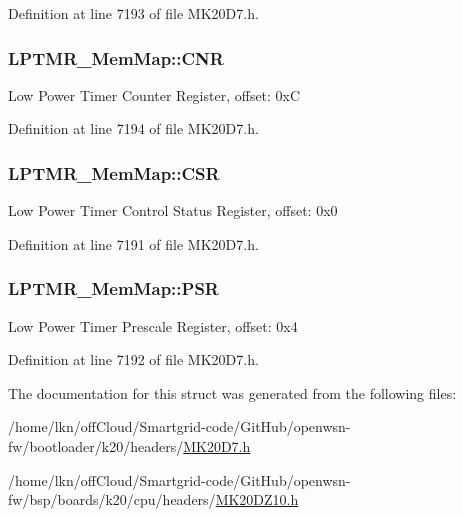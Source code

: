 Definition at line 7193 of file M\+K20\+D7.\+h.

\subsubsection[{\texorpdfstring{C\+NR}{CNR}}]{ L\+P\+T\+M\+R\+\_\+\+Mem\+Map\+::\+C\+NR}\hypertarget{struct_l_p_t_m_r___mem_map_adda036ea26ea5cc89d7957779c5680f0}{}\label{struct_l_p_t_m_r___mem_map_adda036ea26ea5cc89d7957779c5680f0}
Low Power Timer Counter Register, offset\+: 0xC 

Definition at line 7194 of file M\+K20\+D7.\+h.

\subsubsection[{\texorpdfstring{C\+SR}{CSR}}]{ L\+P\+T\+M\+R\+\_\+\+Mem\+Map\+::\+C\+SR}\hypertarget{struct_l_p_t_m_r___mem_map_a4dcb593756f09d67e3d064d95e3f2d68}{}\label{struct_l_p_t_m_r___mem_map_a4dcb593756f09d67e3d064d95e3f2d68}
Low Power Timer Control Status Register, offset\+: 0x0 

Definition at line 7191 of file M\+K20\+D7.\+h.

\subsubsection[{\texorpdfstring{P\+SR}{PSR}}]{ L\+P\+T\+M\+R\+\_\+\+Mem\+Map\+::\+P\+SR}\hypertarget{struct_l_p_t_m_r___mem_map_a05f0c5c90722e5a1757c262c818d2462}{}\label{struct_l_p_t_m_r___mem_map_a05f0c5c90722e5a1757c262c818d2462}
Low Power Timer Prescale Register, offset\+: 0x4 

Definition at line 7192 of file M\+K20\+D7.\+h.



The documentation for this struct was generated from the following files\+:\begin{DoxyCompactItemize}
\item 
/home/lkn/off\+Cloud/\+Smartgrid-\/code/\+Git\+Hub/openwsn-\/fw/bootloader/k20/headers/\hyperlink{bootloader_2k20_2headers_2_m_k20_d7_8h}{M\+K20\+D7.\+h}\item 
/home/lkn/off\+Cloud/\+Smartgrid-\/code/\+Git\+Hub/openwsn-\/fw/bsp/boards/k20/cpu/headers/\hyperlink{_m_k20_d_z10_8h}{M\+K20\+D\+Z10.\+h}\end{DoxyCompactItemize}
